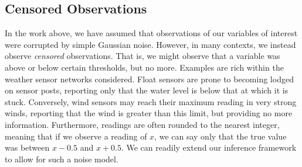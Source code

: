 \documentclass{acmsmall}
\begin{document}
\subsection{Censored Observations}\label{sec:censored}

In the work above, we have assumed that observations of our variables of interest were corrupted by simple Gaussian noise. However, in many contexts, we instead observe \emph{censored} observations. That is, we might observe that a variable was above or below certain thresholds, but no more. Examples are rich within the weather sensor networks considered. Float sensors are prone to becoming lodged on sensor posts, reporting only that the water level is below that at which it is stuck. Conversely, wind sensors may reach their maximum reading in very strong winds, reporting that the wind is greater than this limit, but providing no more information. Furthermore, readings are often rounded to the nearest integer, meaning that if we observe a reading of $x$, we can say only that the true value was between $x-0.5$ and $x+0.5$. We can readily extend our inference framework to allow for such a noise model. 
\end{document}
